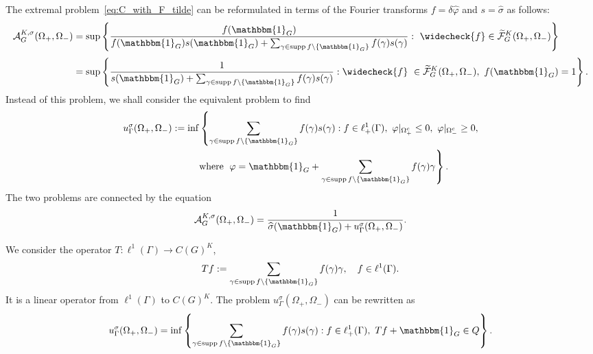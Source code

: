 \documentclass[[a4paper,english,12pt]{amsart}
\theoremstyle{plain}
\theoremstyle{remark}
\newcommand\supp{\operatorname{supp}}
\begin{document}
The extremal problem~\eqref{eq:C_with_F_tilde} can be reformulated in terms of the Fourier transforms $f = \delta \widehat{\varphi}$ and $s = \widehat{\sigma}$ as follows:
\begin{align*}
\mathcal{A}^{K,\sigma}_{G}(\Omega_+, \Omega_{-}) = \sup & \left\{ \frac{ f(\mathbbm{1}_{G}) }{ f(\mathbbm{1}_{G}) s(\mathbbm{1}_{G}) + \sum_{\gamma \in \supp{f} \setminus \{\mathbbm{1}_G\}} f(\gamma) s(\gamma)}  :  \  \widecheck{f} \in \widetilde{\mathcal{F}}^K_G(\Omega_+, \Omega_-)  \right\} \\[1mm]
= \sup & \left\{ \frac{ 1 }{s(\mathbbm{1}_G) + \sum_{\gamma \in \supp{f} \setminus \{\mathbbm{1}_G\}} f(\gamma) s(\gamma)}  : \widecheck{f}\ \in \widetilde{\mathcal{F}}^K_G(\Omega_+, \Omega_-), \ f(\mathbbm{1}_{G})= 1  \right\}.
\end{align*}
Instead of this problem, we shall consider the equivalent problem to find
\begin{align*}
u_{\Gamma}^{\sigma}(\Omega_+, \Omega_-)  := \inf & \left\{ \sum_{\gamma \in  \supp{f} \setminus \{\mathbbm{1}_G\}} f(\gamma) s(\gamma) : \right.   f \in \ell^1_+(\Gamma), \
\varphi|_{\Omega_+^c} \le 0, \ \varphi|_{\Omega_-^c} \ge 0, \\
& \text{where }\left. \varphi = \mathbbm{1}_G + \sum_{\gamma \in \supp{f} \setminus \{\mathbbm{1}_G\}} f(\gamma) \gamma
\right\}.
\end{align*}
The two problems are connected by the equation
\begin{equation} \label{eq:C-u}
\mathcal{A}^{K,\sigma}_G(\Omega_+, \Omega_{-}) = \frac{1}{\widehat{\sigma}(\mathbbm{1}_{G}) + u_\Gamma^\sigma(\Omega_+, \Omega_-)}.
\end{equation}

We consider the operator $T : \ell^1(\Gamma) \to C(G)^K$,
$$
T f := \sum_{\gamma \in \supp{f} \setminus \{\mathbbm{1}_G\}}  f(\gamma) \gamma, \quad f \in \ell^1(\Gamma).
$$
It is a linear operator from $\ell^1(\Gamma)$ to $C(G)^K$. The problem $u_\Gamma^{\sigma}(\Omega_+, \Omega_{-})$ can be rewritten as 
$$
u_\Gamma^{\sigma}(\Omega_+, \Omega_-) = \inf \left\{ \sum_{\gamma \in  \supp{f} \setminus \{\mathbbm{1}_G\}} f(\gamma) s(\gamma) : f \in \ell^1_+(\Gamma),  \ Tf + \mathbbm{1}_G \in Q  \right\}.
$$
\end{document}
